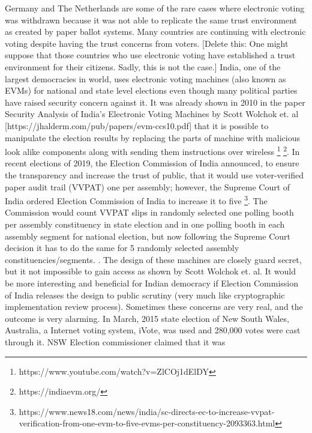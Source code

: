   
  Germany and The Netherlands are some of the rare cases where 
  electronic voting was withdrawn because it was not able to 
  replicate the same trust environment as created by paper 
  ballot systems. Many countries are continuing with 
  electronic voting despite having the trust concerns 
  from voters.
  [Delete this: One might suppose that those countries who 
  use electronic voting have established a trust environment 
  for their citizens. Sadly, 
  this is not the case.]
  India, one of the largest democracies in world, 
  uses electronic voting machines (also known as EVMs) for national 
  and state level 
  elections even though many political parties have raised security 
  concern against it.
  It was already shown in 2010 in the paper 
  Security Analysis of India's Electronic Voting Machines by 
  Scott Wolchok et. al 
  [https://jhalderm.com/pub/papers/evm-ccs10.pdf] that it 
  is possible to manipulate the election results by replacing the 
  parts of machine with malicious look alike components along with sending 
  them instructions over wireless
  \footnote{https://www.youtube.com/watch?v=ZlCOj1dElDY} 
  \footnote{https://indiaevm.org/}. 
  In recent elections of 2019, the Election Commission of India 
  announced, to ensure the transparency and 
  increase the trust of public, that it would use 
  voter-verified paper audit trail (VVPAT) 
  one per assembly; however, the Supreme Court of India ordered Election 
  Commission of India to increase it to five
  \footnote{https://www.news18.com/news/india/sc-directs-ec-to-increase-vvpat-verification-from-one-evm-to-five-evms-per-constituency-2093363.html}.
  The Commission  would count VVPAT slips 
  in randomly selected one polling booth per assembly 
  constituency in state election and 
  in one polling booth in each assembly segment for national election, but 
  now following the Supreme Court decision it has to do the same for 
  5 randomly selected assembly constituencies/segments. 
  . The design of these 
  machines are closely guard secret,  but it not impossible to gain 
  access as shown by  Scott Wolchok et. al. It would be more 
  interesting and beneficial for Indian democracy if Election 
  Commission of India
  releases the design to public scrutiny (very much like cryptographic
  implementation review process). Sometimes these concerns are very 
  real, and the outcome is very alarming. In March, 2015 state election 
  of New South Wales, Australia, a Internet voting system, iVote,    
  was used and 280,000 votes were cast through it. NSW Election 
  commissioner claimed that it was 
 
